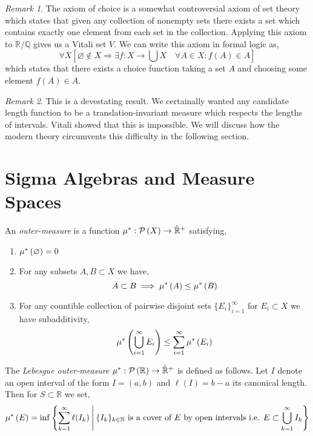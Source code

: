\documentclass{article}
\newcommand{\N}{\mathbb{N}}
\newcommand{\Q}{\mathbb{Q}}
\newcommand{\R}{\mathbb{R}}
\newenvironment{definition}[1][Definition:]{\begin{trivlist}
\item[\hskip \labelsep {\bfseries #1}]}{\end{trivlist}}
\theoremstyle{theorem}
\theoremstyle{definition}
\theoremstyle{definition}
\theoremstyle{remark}
\theoremstyle{definition}
\theoremstyle{remark}
\newtheorem{remark}{Remark}[subsection]
\begin{document}
\begin{remark}
The axiom of choice is a somewhat controversial axiom of set theory which states that given any collection of nonempty sets there exists a set which contains exactly one element from each set in the collection. Applying this axiom to $\R / \Q$ gives us a Vitali set $V$. We can write this axiom in formal logic as,
\[ \forall X [ \varnothing \notin X \Longrightarrow \exists f : X \rightarrow \bigcup X \quad \forall A \in X :  f ( A ) \in A  ] \]
which states that there exists a choice function taking a set $A$ and choosing some element $f(A) \in A$. 
\end{remark}

\begin{remark}
This is a devestating result. We certainally wanted any candidate length function to be a translation-invariant measure which respects the lengths of intervals. Vitali showed that this is impossible. We will discuss how the modern theory circumvents this difficulty in the following section. 
\end{remark}

\section{Sigma Algebras and Measure Spaces}

\begin{definition}
An \textit{outer-measure} is a function $\mu^* : \Power{X} \to \Rcomp$ satisfying,
\begin{enumerate}
\item $\mu^*\left( \varnothing \right) = 0$

\item For any subsets $A,B \subset X$ we have,
 \[ A \subset B \implies \mu^*\left( A \right) \le \mu^*\left( B \right) \]

\item For any countible collection of pairwise disjoint sets $\{ E_i \}_{i = 1}^{\infty}$ for $E_i \subset X$ we have subadditivity,
\[ \mu^*\left( \bigcup_{i = 1}^\infty E_i \right) \le \sum_{i = 1}^\infty \mu^*\left( E_i \right) \]
\end{enumerate}
\end{definition}

\begin{definition}
The \textit{Lebesgue outer-measure} $\mu^* : \Power{\R} \to \Rcomp$ is defined as follows. Let $I$ denote an open interval of the form $I = (a,b)$ and $\ell(I) = b - a$ its canonical length. Then for $S \subset \R$ we set,
\[ \outmeasure{E} = \inf{\left\{ \sum_{k = 1}^{\infty} \ell(I_k) \: \middle| \: \{I_k\}_{k\in\N} \text{ is a cover of } E \text{ by open intervals i.e. } E \subset \bigcup_{k = 1}^\infty I_k \right\}} \]
\end{definition}
\end{document}
